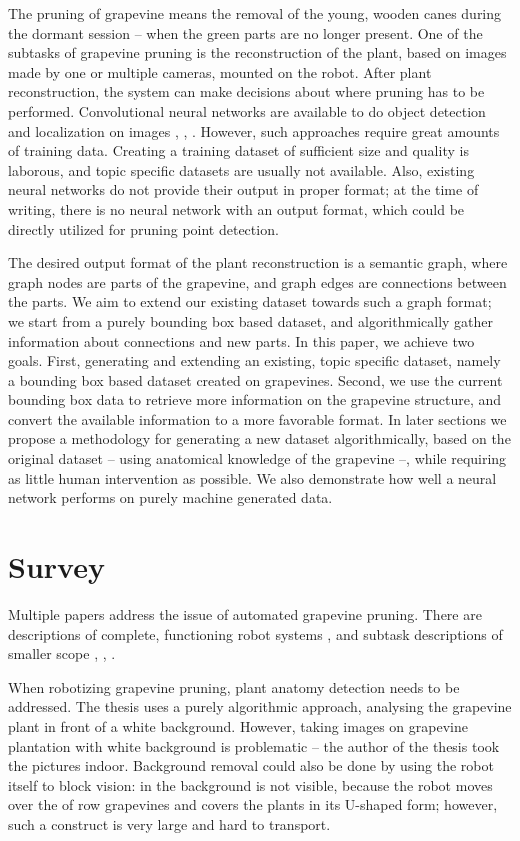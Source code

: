 \documentclass{PSAIE}%
\begin{document}
The pruning of grapevine means the removal of the young, wooden canes during the dormant session
-- when the green parts are no longer present.
One of the subtasks of grapevine pruning is the reconstruction of the plant, based on images made by
one or multiple cameras, mounted on the robot. After plant reconstruction, the system can make decisions
about where pruning has to be performed. Convolutional neural networks are available to do
object detection and localization on images \cite{glenn_jocher_2021_5563715}, \cite{matterport_maskrcnn_2017},
\cite{liu2016ssd}. However, such approaches require great amounts of training data. Creating a training
dataset of sufficient size and quality is laborous, and topic specific datasets are usually not available.
Also, existing neural networks do not provide their output in proper format; at the time of writing,
there is no neural network with an output format, which could be directly utilized for pruning point
detection.

The desired output format of the plant reconstruction is a semantic graph, where graph nodes are parts
of the grapevine, and graph edges are connections between the parts. We aim to extend our existing
dataset towards such a graph format; we start from a purely bounding box based dataset, and algorithmically
gather information about connections and new parts. In this paper, we achieve two goals. First, generating and
extending an existing, topic specific dataset, namely a bounding box based dataset created on grapevines.
Second, we use the current
bounding box data to retrieve more information on the grapevine structure, and convert the available
information to a more favorable format. In later sections we propose a methodology for generating a
new dataset algorithmically, based on the original dataset -- using anatomical knowledge of the
grapevine --, while requiring as little human intervention as possible. We also demonstrate how well a
neural network performs on purely machine generated data.

\section{Survey} \label{sec_survey}
Multiple papers address the issue of automated grapevine pruning. There are descriptions of complete,
functioning robot systems \cite{botterill2017robot}, and subtask descriptions of smaller scope
\cite{fernandes2021grapevine}, \cite{katyara2020reproducible}, \cite{goesmannai}.

When robotizing grapevine pruning, plant anatomy detection needs to be addressed. The thesis
\cite{white_background_grape} uses a purely algorithmic approach, analysing the grapevine plant
in front of a white background. However, taking images on grapevine plantation with white background
is problematic -- the author of the thesis took the pictures indoor. Background removal could also be
done by using the robot itself to block vision: in \cite{botterill2017robot} the background is not
visible, because the robot moves over the of row grapevines and covers the plants in its U-shaped form;
however, such a construct is very large and hard to transport.
\end{document}
